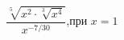 \begin{ex}[type=simplify_calculate]
	\begin{condition}
		\( \dfrac{\sqrt[5]{x^2\cdot\sqrt[3]{x^4}}}{x^{-7/30}} \),\quad при \( x=1 \)
	\end{condition}
\end{ex}